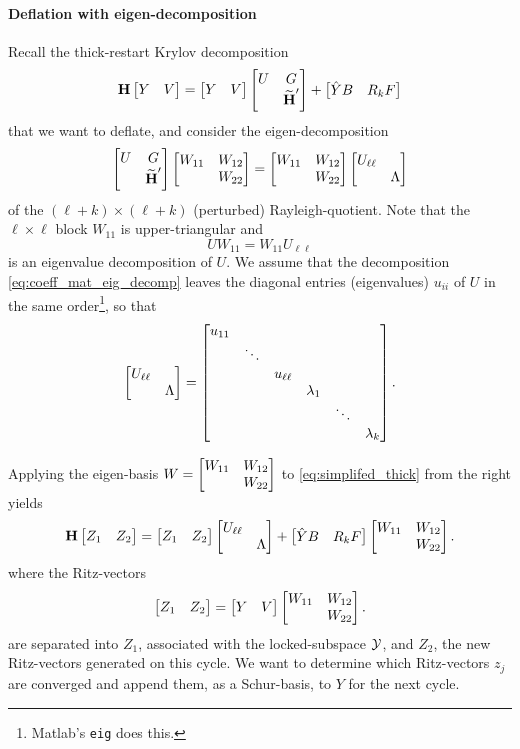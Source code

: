 \paragraph{Deflation with eigen-decomposition}
Recall the thick-restart Krylov decomposition 
\begin{equation}
\textbf{\textup{H}} \begin{bmatrix} Y &V\end{bmatrix} =  \begin{bmatrix} Y & V \end{bmatrix}
\begin{bmatrix} U & G \\ &\widetilde{\textbf{\textup{H}}}^\prime\end{bmatrix} +   \begin{bmatrix} \hat{Y} B  &  R_k F\end{bmatrix}
\label{eq:simplifed_thick}
\end{equation}    
that we want to deflate, and consider the eigen-decomposition
\begin{equation}
\begin{bmatrix} U & G \\ &\widetilde{\textbf{\textup{H}}}^\prime\end{bmatrix}\begin{bmatrix} W_{11}&W_{12}\\&W_{22}\end{bmatrix} 
=
\begin{bmatrix} W_{11}&W_{12}\\&W_{22}\end{bmatrix} 
\begin{bmatrix} U_{\ell\ell} &\\&\Lambda\end{bmatrix}
\label{eq:coeff_mat_eig_decomp}
\end{equation}
of the $(\ell+k)\times (\ell+k)$ (perturbed) Rayleigh-quotient.
Note that the $\ell \times \ell$ block  $W_{11}$ is upper-triangular and
\[
U W_{11}=W_{11} U_{\ell\ell}
\]
 is an eigenvalue decomposition of  $U$.  We assume that the decomposition \eqref{eq:coeff_mat_eig_decomp} leaves the diagonal entries (eigenvalues) $u_{ii}$ of $U$ in the same order\footnote{Matlab's \texttt{eig} does this.}, so that 
\[
\mat{U_{\ell\ell} &\\&\Lambda}
=
\mat{u_{11} \\%
         &\ddots\\
	&&u_{\ell\ell}\\
	&&&\lambda_1\\
&&&&\ddots\\
&&&&&\lambda_k}.
\]

Applying the eigen-basis $W=\begin{bmatrix} W_{11}&W_{12}\\&W_{22}\end{bmatrix}$ to \eqref{eq:simplifed_thick} from the right yields 
\begin{equation}
\textbf{\textup{H}} \begin{bmatrix} Z_1 & Z_2 \end{bmatrix} = 
\begin{bmatrix} Z_1 & Z_2 \end{bmatrix}\begin{bmatrix} U_{\ell\ell} &\\&\Lambda\end{bmatrix} 
+  \begin{bmatrix} \hat{Y} B  &  R_k F\end{bmatrix}\begin{bmatrix} W_{11}&W_{12}\\&W_{22}\end{bmatrix}. 
\label{eq:thick_ritz_ROM}
\end{equation}   
where the Ritz-vectors 
\[
\begin{bmatrix} Z_1 & Z_2 \end{bmatrix} 
= 
\begin{bmatrix} Y&V\end{bmatrix} \begin{bmatrix} W_{11}&W_{12}\\&W_{22}\end{bmatrix} .  
\]
are separated into $Z_1$, associated with the locked-subspace $\mathcal{Y}$, and $Z_2$, the new Ritz-vectors generated on this cycle.  We want to determine which Ritz-vectors $z_j$ are converged and append them, as a Schur-basis, to $Y$ for the next cycle.  




